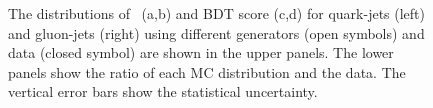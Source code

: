 \begin{figure}[htb]
	\caption[]{
		The distributions of \ntrk~(a,b) and BDT score (c,d) for quark-jets (left) and gluon-jets (right) using different generators (open symbols) and data (closed symbol) are shown in the upper panels. The lower panels show the ratio of each MC distribution and the data. The vertical error bars show the statistical uncertainty.%
		\label{fig:QG-roc-com12}
	}
\end{figure}


